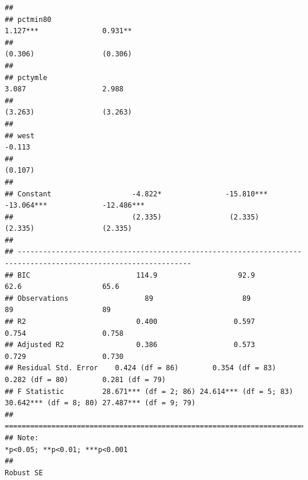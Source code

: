 \documentclass[]{article}
\begin{document}
\begin{verbatim}
##                                                                                                                
## pctmin80                                                                 1.127***               0.931**        
##                                                                          (0.306)                (0.306)        
##                                                                                                                
## pctymle                                                                   3.087                  2.988         
##                                                                          (3.263)                (3.263)        
##                                                                                                                
## west                                                                                             -0.113        
##                                                                                                 (0.107)        
##                                                                                                                
## Constant                   -4.822*               -15.810***             -13.064***             -12.486***      
##                            (2.335)                (2.335)                (2.335)                (2.335)        
##                                                                                                                
## ---------------------------------------------------------------------------------------------------------------
## BIC                         114.9                   92.9                   62.6                   65.6         
## Observations                  89                     89                     89                     89          
## R2                          0.400                  0.597                  0.754                  0.758         
## Adjusted R2                 0.386                  0.573                  0.729                  0.730         
## Residual Std. Error    0.424 (df = 86)        0.354 (df = 83)        0.282 (df = 80)        0.281 (df = 79)    
## F Statistic         28.671*** (df = 2; 86) 24.614*** (df = 5; 83) 30.642*** (df = 8; 80) 27.487*** (df = 9; 79)
## ===============================================================================================================
## Note:                                                                             *p<0.05; **p<0.01; ***p<0.001
##                                                                                                       Robust SE
\end{verbatim}
\end{document}
